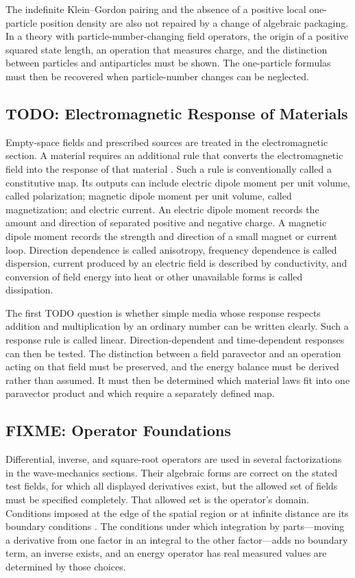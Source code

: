 The indefinite Klein--Gordon pairing and the absence of a positive local
one-particle position density are also not repaired by a change of algebraic
packaging. In a theory with particle-number-changing field operators, the
origin of a positive squared state length, an operation that measures charge,
and the distinction between particles and antiparticles must be shown. The
one-particle formulas must then be recovered when particle-number changes can
be neglected.

\subsection{TODO: Electromagnetic Response of Materials}
Empty-space fields and prescribed sources are treated in the electromagnetic section.
A material requires an additional rule that converts the electromagnetic
field into the response of that material \cite{jackson1998}. Such a rule is
conventionally called a constitutive map. Its outputs can include electric
dipole moment per unit volume, called polarization; magnetic dipole moment
per unit volume, called magnetization; and electric current. An electric
dipole moment records the amount and direction of separated positive and
negative charge. A magnetic dipole moment records the strength and direction
of a small magnet or current loop. Direction
dependence is called anisotropy, frequency dependence is called dispersion,
current produced by an electric field is described by conductivity, and
conversion of field energy into heat or other unavailable forms is called
dissipation.

The first TODO question is whether simple media whose response respects
addition and multiplication by an ordinary number can be written clearly.
Such a response rule is called linear. Direction-dependent and
time-dependent responses can then be tested. The distinction between a field
paravector and an operation acting on that field must be preserved, and the
energy balance must be derived rather than assumed. It must then be
determined which material laws fit into one paravector product and which
require a separately defined map.

\subsection{FIXME: Operator Foundations}
Differential, inverse, and square-root operators are used in several
factorizations in the wave-mechanics sections. Their algebraic
forms are correct on the stated test fields, for which all displayed
derivatives exist, but the allowed set of fields must be specified
completely. That allowed set is the operator's domain. Conditions imposed at
the edge of the spatial region or at infinite distance are its boundary
conditions \cite{greiner2000,sakurai2017}. The conditions under which
integration by parts---moving a derivative from one factor in an integral to
the other factor---adds no boundary term, an inverse exists, and an energy
operator has real measured values are determined by those choices.

